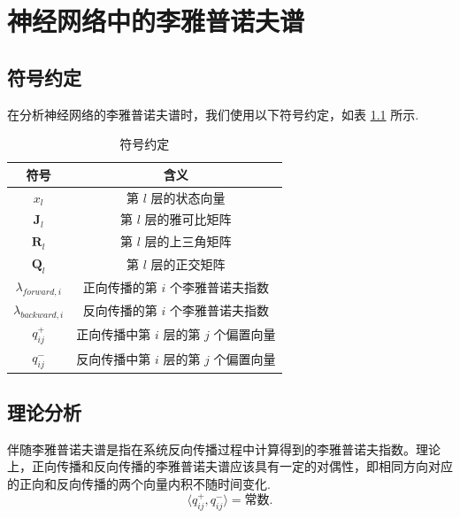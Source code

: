 
\chapter{神经网络中的李雅普诺夫谱}

\section{符号约定}

在分析神经网络的李雅普诺夫谱时，我们使用以下符号约定，如表 \ref{tab:symbols} 所示.

\begin{table}[htbp]
  \centering
  \caption{符号约定}
  \label{tab:symbols}
  \begin{tabular}{cc}
    \toprule
    符号                      & 含义                                             \\
    \midrule
    \(x_l\)                   & 第 \(l\) 层的状态向量                            \\
    \(\mathbf{J}_l\)          & 第 \(l\) 层的雅可比矩阵                          \\
    \(\mathbf{R}_l\)          & 第 \(l\) 层的上三角矩阵                          \\
    \(\mathbf{Q}_l\)          & 第 \(l\) 层的正交矩阵                            \\
    \(\lambda_{forward, i}\)  & 正向传播的第 \(i\) 个李雅普诺夫指数              \\
    \(\lambda_{backward, i}\) & 反向传播的第 \(i\) 个李雅普诺夫指数              \\
    \(q_{ij}^{+}\)             & 正向传播中第 \(i\) 层的第 \(j\) 个偏置向量 \\
    \(q_{ij}^{-}\)      & 反向传播中第 \(i\) 层的第 \(j\) 个偏置向量 \\
    \bottomrule
  \end{tabular}
\end{table}

\section{理论分析}

伴随李雅普诺夫谱是指在系统反向传播过程中计算得到的李雅普诺夫指数。理论上，正向传播和反向传播的李雅普诺夫谱应该具有一定的对偶性，即相同方向对应的正向和反向传播的两个向量内积不随时间变化.
\begin{equation}
  \langle q_{i j}^{+}, q_{i j}^{-} \rangle = \text{常数}.
\end{equation}

